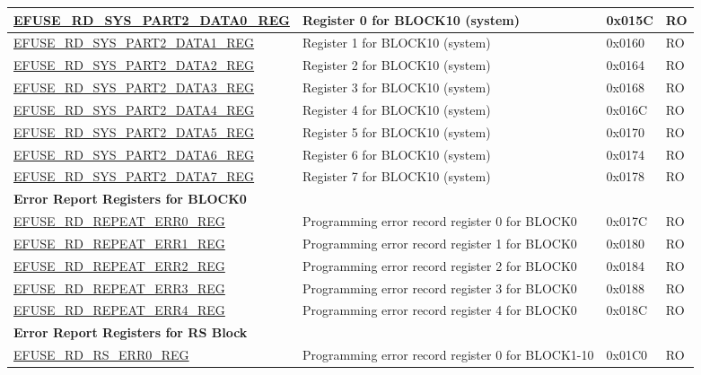 \begin{longtable}{ | p{7cm} | p{7.2cm} | p{1.3cm} | p{1cm} | }
\hyperref[regdesc:EFUSERDSYSPART2DATANREG]{EFUSE\_RD\_SYS\_PART2\_DATA0\_REG} & Register 0 for BLOCK10 (system) & 0x015C & RO \\ \hline
\hyperref[regdesc:EFUSERDSYSPART2DATANREG]{EFUSE\_RD\_SYS\_PART2\_DATA1\_REG} & Register 1 for BLOCK10 (system) & 0x0160 & RO \\ \hline
\hyperref[regdesc:EFUSERDSYSPART2DATANREG]{EFUSE\_RD\_SYS\_PART2\_DATA2\_REG} & Register 2 for BLOCK10 (system) & 0x0164 & RO \\ \hline
\hyperref[regdesc:EFUSERDSYSPART2DATANREG]{EFUSE\_RD\_SYS\_PART2\_DATA3\_REG} & Register 3 for BLOCK10 (system) & 0x0168 & RO \\ \hline
\hyperref[regdesc:EFUSERDSYSPART2DATANREG]{EFUSE\_RD\_SYS\_PART2\_DATA4\_REG} & Register 4 for BLOCK10 (system) & 0x016C & RO \\ \hline
\hyperref[regdesc:EFUSERDSYSPART2DATANREG]{EFUSE\_RD\_SYS\_PART2\_DATA5\_REG} & Register 5 for BLOCK10 (system) & 0x0170 & RO \\ \hline
\hyperref[regdesc:EFUSERDSYSPART2DATANREG]{EFUSE\_RD\_SYS\_PART2\_DATA6\_REG} & Register 6 for BLOCK10 (system) & 0x0174 & RO \\ \hline
\hyperref[regdesc:EFUSERDSYSPART2DATANREG]{EFUSE\_RD\_SYS\_PART2\_DATA7\_REG} & Register 7 for BLOCK10 (system) & 0x0178 & RO \\ \hline
\multicolumn{4}{|l|}{\textbf{Error Report Registers for BLOCK0}} \\ \hline
\hyperref[regdesc:EFUSERDREPEATERR0REG]{EFUSE\_RD\_REPEAT\_ERR0\_REG} & Programming error record register 0 for BLOCK0 & 0x017C & RO \\ \hline
\hyperref[regdesc:EFUSERDREPEATERR1REG]{EFUSE\_RD\_REPEAT\_ERR1\_REG} & Programming error record register 1 for BLOCK0 & 0x0180 & RO \\ \hline
\hyperref[regdesc:EFUSERDREPEATERR2REG]{EFUSE\_RD\_REPEAT\_ERR2\_REG} & Programming error record register 2 for BLOCK0 & 0x0184 & RO \\ \hline
\hyperref[regdesc:EFUSERDREPEATERR3REG]{EFUSE\_RD\_REPEAT\_ERR3\_REG} & Programming error record register 3 for BLOCK0 & 0x0188 & RO \\ \hline
\hyperref[regdesc:EFUSERDREPEATERR4REG]{EFUSE\_RD\_REPEAT\_ERR4\_REG} & Programming error record register 4 for BLOCK0 & 0x018C & RO \\ \hline
\multicolumn{4}{|l|}{\textbf{Error Report Registers for RS Block}} \\ \hline
\hyperref[regdesc:EFUSERDRSERR0REG]{EFUSE\_RD\_RS\_ERR0\_REG} & Programming error record register 0 for BLOCK1-10 & 0x01C0 & RO \\ \hline

\end{longtable}
